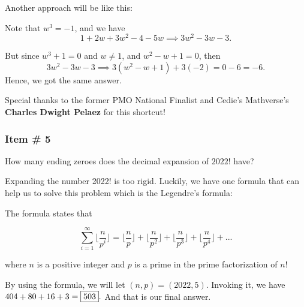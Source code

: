 \documentclass[11pt,paper=letter]{scrartcl}
\begin{document}

Another approach will be like this:

Note that $w^3 = -1$, and we have $$1 + 2w + 3w^2 -4 - 5w \implies 3w^2 -3w -3.$$

But since $w^3 + 1 = 0$ and $w \neq 1$, and $w^2 - w + 1 =0$, then $$3w^2 -3w -3 \implies 3(w^2 - w + 1) + 3(-2) = 0 - 6 = -6. $$ Hence, we got the same answer.

\begin{mdframed}
\begin{rem}
Special thanks to the former PMO National Finalist and Cedie's Mathverse's \textbf{Charles Dwight Pelaez} for this shortcut!
\end{rem}
\end{mdframed}
\subsubsection{Item \# 5}

\begin{probboxed}
How many ending zeroes does the decimal expansion of $2022!$ have?
    
\end{probboxed}
  
 
 \sol
 
Expanding the number 2022! is too rigid. Luckily, we have one formula that can help us to solve this problem which is the Legendre's formula:

\begin{mdframed}
\begin{theorem}

The formula states that

\begin{equation*}
    \sum_{i=1} ^{\infty} \bigg \lfloor \dfrac{n}{p^i} \bigg \rfloor = \bigg \lfloor \dfrac{n}{p} \bigg \rfloor + \bigg \lfloor \dfrac{n}{p^2} \bigg \rfloor + \bigg \lfloor \dfrac{n}{p^3} \bigg \rfloor + \bigg \lfloor \dfrac{n}{p^4} \bigg \rfloor + ...
\end{equation*}

where $n$ is a positive integer and $p$ is a prime in the prime factorization of $n!$

\end{theorem}
\end{mdframed}

By using the formula, we will let $(n,p) = (2022, 5)$. Invoking it, we have $404 + 80 + 16 + 3 = \fbox{503}.$ And that is our final answer.
\end{document}
